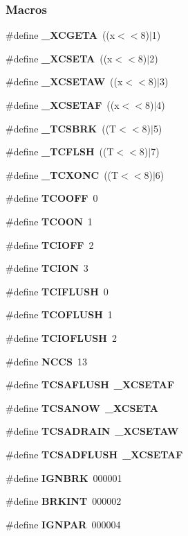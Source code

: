 \subsubsection*{Macros}
\begin{DoxyCompactItemize}
\item 
\#define {\bf \+\_\+\+X\+C\+G\+E\+TA}~((\textquotesingle{}x\textquotesingle{}$<$$<$8)$\vert$1)
\item 
\#define {\bf \+\_\+\+X\+C\+S\+E\+TA}~((\textquotesingle{}x\textquotesingle{}$<$$<$8)$\vert$2)
\item 
\#define {\bf \+\_\+\+X\+C\+S\+E\+T\+AW}~((\textquotesingle{}x\textquotesingle{}$<$$<$8)$\vert$3)
\item 
\#define {\bf \+\_\+\+X\+C\+S\+E\+T\+AF}~((\textquotesingle{}x\textquotesingle{}$<$$<$8)$\vert$4)
\item 
\#define {\bf \+\_\+\+T\+C\+S\+B\+RK}~((\textquotesingle{}T\textquotesingle{}$<$$<$8)$\vert$5)
\item 
\#define {\bf \+\_\+\+T\+C\+F\+L\+SH}~((\textquotesingle{}T\textquotesingle{}$<$$<$8)$\vert$7)
\item 
\#define {\bf \+\_\+\+T\+C\+X\+O\+NC}~((\textquotesingle{}T\textquotesingle{}$<$$<$8)$\vert$6)
\item 
\#define {\bf T\+C\+O\+O\+FF}~0
\item 
\#define {\bf T\+C\+O\+ON}~1
\item 
\#define {\bf T\+C\+I\+O\+FF}~2
\item 
\#define {\bf T\+C\+I\+ON}~3
\item 
\#define {\bf T\+C\+I\+F\+L\+U\+SH}~0
\item 
\#define {\bf T\+C\+O\+F\+L\+U\+SH}~1
\item 
\#define {\bf T\+C\+I\+O\+F\+L\+U\+SH}~2
\item 
\#define {\bf N\+C\+CS}~13
\item 
\#define {\bf T\+C\+S\+A\+F\+L\+U\+SH}~{\bf \+\_\+\+X\+C\+S\+E\+T\+AF}
\item 
\#define {\bf T\+C\+S\+A\+N\+OW}~{\bf \+\_\+\+X\+C\+S\+E\+TA}
\item 
\#define {\bf T\+C\+S\+A\+D\+R\+A\+IN}~{\bf \+\_\+\+X\+C\+S\+E\+T\+AW}
\item 
\#define {\bf T\+C\+S\+A\+D\+F\+L\+U\+SH}~{\bf \+\_\+\+X\+C\+S\+E\+T\+AF}
\item 
\#define {\bf I\+G\+N\+B\+RK}~000001
\item 
\#define {\bf B\+R\+K\+I\+NT}~000002
\item 
\#define {\bf I\+G\+N\+P\+AR}~000004
$$
\end{DoxyCompactItemize}
